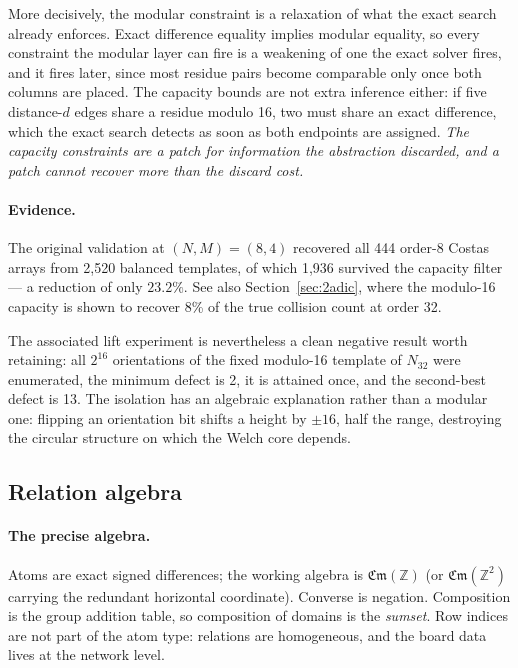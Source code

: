 \documentclass[11pt,a4paper]{article}
\theoremstyle{definition}
\newcommand{\Z}{\mathbb{Z}}
\newcommand{\Cm}{\mathfrak{Cm}}
\begin{document}
More decisively, the modular constraint is a relaxation of what the exact search
already enforces. Exact difference equality implies modular equality, so every
constraint the modular layer can fire is a weakening of one the exact solver
fires, and it fires later, since most residue pairs become comparable only once
both columns are placed. The capacity bounds are not extra inference either: if
five distance-$d$ edges share a residue modulo 16, two must share an exact
difference, which the exact search detects as soon as both endpoints are
assigned. \emph{The capacity constraints are a patch for information the
abstraction discarded, and a patch cannot recover more than the discard cost.}

\paragraph{Evidence.} The original validation at $(N,M)=(8,4)$ recovered all 444
order-8 Costas arrays from 2{,}520 balanced templates, of which 1{,}936 survived
the capacity filter --- a reduction of only $\mathbf{23.2\%}$. See also
Section~\ref{sec:2adic}, where the modulo-16 capacity is shown to recover 8\% of
the true collision count at order 32.

The associated lift experiment is nevertheless a clean negative result worth
retaining: all $2^{16}$ orientations of the fixed modulo-16 template of $N_{32}$
were enumerated, the minimum defect is 2, it is attained once, and the
second-best defect is 13. The isolation has an algebraic explanation rather than
a modular one: flipping an orientation bit shifts a height by $\pm16$, half the
range, destroying the circular structure on which the Welch core depends.

\subsection{Relation algebra}
\label{sec:ra}

\paragraph{The precise algebra.} Atoms are exact signed differences; the working
algebra is $\Cm(\Z)$ (or $\Cm(\Z^2)$ carrying the redundant horizontal
coordinate). Converse is negation. Composition is the group addition table, so
composition of domains is the \emph{sumset}. Row indices are not part of the atom
type: relations are homogeneous, and the board data lives at the network level.
\end{document}
